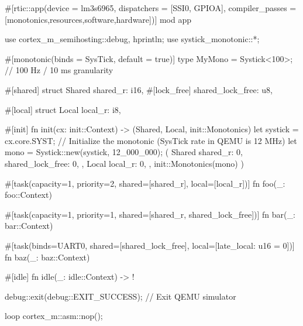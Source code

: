 #[rtic::app(device = lm3s6965, dispatchers = [SSI0, GPIOA], 
    compiler_passes = [monotonics,resources,software,hardware])]
mod app {
    use cortex_m_semihosting::{debug, hprintln};
    use systick_monotonic::*;

    #[monotonic(binds = SysTick, default = true)]
    type MyMono = Systick<100>; // 100 Hz / 10 ms granularity

    #[shared]
    struct Shared {
        shared_r: i16,
        #[lock_free]
        shared_lock_free: u8,
    }

    #[local]
    struct Local {
        local_r: i8,
    }

    #[init]
    fn init(cx: init::Context) -> (Shared, Local, init::Monotonics) {
        let systick = cx.core.SYST;
        // Initialize the monotonic (SysTick rate in QEMU is 12 MHz)
        let mono = Systick::new(systick, 12_000_000);
        (
            Shared {
                shared_r: 0,
                shared_lock_free: 0,
            }, 
            Local {
                local_r: 0,
            }, 
            init::Monotonics(mono)
        )
    }

    #[task(capacity=1, priority=2, shared=[shared_r], local=[local_r])]
    fn foo(_: foo::Context) {
    }

    #[task(capacity=1, priority=1, shared=[shared_r, shared_lock_free])]
    fn bar(_: bar::Context) {
    }

    #[task(binds=UART0, shared=[shared_lock_free], local=[late_local: u16 = 0])]
    fn baz(_: baz::Context){
    }

    #[idle]
    fn idle(_: idle::Context) -> ! {
        debug::exit(debug::EXIT_SUCCESS); // Exit QEMU simulator

        loop {
            cortex_m::asm::nop();
        }
    }
}
